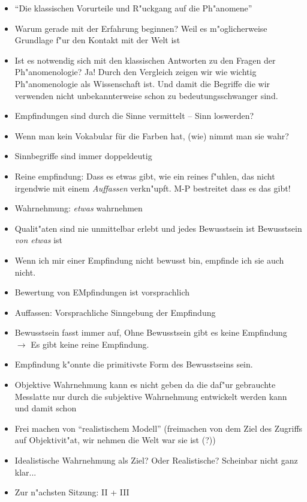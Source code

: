 \documentclass[emulatestandardclasses]{scrartcl}
\begin{document}
\begin{itemize}
  \item "`Die klassischen Vorurteile und R"uckgang auf die Ph"anomene"'
  \item Warum gerade mit der Erfahrung beginnen? Weil es m"oglicherweise Grundlage f"ur den Kontakt mit der Welt ist 
  \item Ist es notwendig sich mit den klassischen Antworten zu den Fragen der Ph"anomenologie? Ja! Durch den Vergleich zeigen wir wie wichtig Ph"anomenologie als Wissenschaft ist. Und damit die Begriffe die wir verwenden nicht unbekannterweise schon zu bedeutungsschwanger sind.
  \item Empfindungen sind durch die Sinne vermittelt -- Sinn loswerden?
  \item Wenn man kein Vokabular für die Farben hat, (wie) nimmt man sie wahr?
  \item Sinnbegriffe sind immer doppeldeutig
  \item Reine empfindung: Dass es etwas gibt, wie ein reines f"uhlen, das nicht irgendwie mit einem \emph{Auffassen} verkn"upft. M-P bestreitet dass es das gibt!
  \item Wahrnehmung: \emph{etwas} wahrnehmen
  \item Qualit"aten sind nie unmittelbar erlebt und jedes Bewusstsein ist Bewusstsein \emph{von etwas} ist
  \item Wenn ich mir einer Empfindung nicht bewusst bin, empfinde ich sie auch nicht.
  \item Bewertung von EMpfindungen ist vorsprachlich
  \item Auffassen: Vorsprachliche Sinngebung der Empfindung
  \item Bewusstsein fasst immer auf, Ohne Bewusstsein gibt es keine Empfindung $\rightarrow$ Es gibt keine reine Empfindung.
  \item Empfindung k"onnte die primitivste Form des Bewusstseins sein. 
  \item Objektive Wahrnehmung kann es nicht geben da die daf"ur gebrauchte Messlatte nur durch die subjektive Wahrnehmung entwickelt werden kann und damit schon
  \item Frei machen von "`realistischem Modell"' (freimachen von dem Ziel des Zugriffs auf Objektivit"at, wir nehmen die Welt war sie ist (?))
  \item Idealistische Wahrnehmung als Ziel? Oder Realistische? Scheinbar nicht ganz klar...
  \item Zur n"achsten Sitzung: II + III
\end{itemize}
\end{document}
